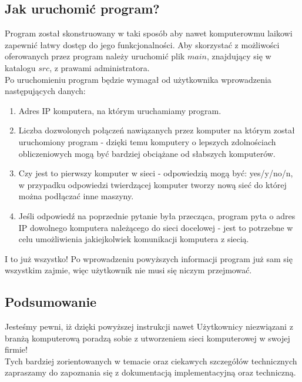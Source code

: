 \subsection{Jak uruchomić program?}
Program został skonstruowany w taki sposób aby nawet komputerowmu laikowi zapewnić łatwy dostęp do jego funkcjonalności. Aby skorzystać z możliwości oferowanych przez program należy uruchomić plik $main$, znajdujący się w katalogu $src$, z prawami administratora.\\
\indent Po uruchomieniu program będzie wymagał od użytkownika wprowadzenia następujących danych:
\begin{enumerate}
\item Adres IP komputera, na którym uruchamiamy program.
\item Liczba dozwolonych połączeń nawiązanych przez komputer na którym został uruchomiony program - dzięki temu komputery o lepszych zdolnościach obliczeniowych mogą być bardziej obciążane od słabszych komputerów.
\item Czy jest to pierwszy komputer w sieci - odpowiedzią mogą być: yes/y/no/n, w przypadku odpowiedzi twierdzącej komputer tworzy nową sieć do której można podłączać inne maszyny.
\item Jeśli odpowiedź na poprzednie pytanie była przecząca, program pyta o adres IP dowolnego komputera należącego do sieci docelowej - jest to potrzebne w celu umożliwienia jakiejkolwiek komunikacji komputera z siecią.
\end{enumerate}
\indent I to już wszystko! Po wprowadzeniu powyższych informacji program już sam się wszystkim zajmie, więc użytkownik nie musi się niczym przejmować.

\subsection{Podsumowanie}
Jesteśmy pewni, iż dzięki powyższej instrukcji nawet Użytkownicy niezwiązani z branżą komputerową poradzą sobie z utworzeniem sieci komputerowej w swojej firmie!\\
\indent Tych bardziej zorientowanych w temacie oraz ciekawych szczegółów technicznych zapraszamy do zapoznania się z dokumentacją implementacyjną oraz techniczną.